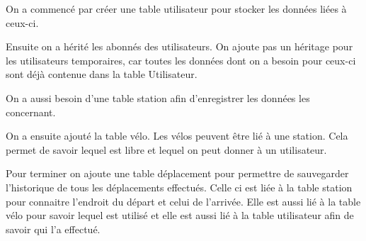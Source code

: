 \documentclass[a4paper, 12pt]{report}
\begin{document}
On a commencé par créer une table utilisateur pour stocker les données liées à ceux-ci.

Ensuite  on a hérité les abonnés des utilisateurs. On ajoute pas un héritage pour les utilisateurs temporaires, car toutes les données dont on a besoin pour ceux-ci sont déjà contenue dans la table Utilisateur.

On a aussi besoin d'une table station afin d'enregistrer les données les concernant.

On a ensuite ajouté la table vélo. Les vélos peuvent être lié à une station. Cela permet de savoir lequel est libre et lequel on peut donner à un utilisateur.

Pour terminer on ajoute une table déplacement pour permettre de sauvegarder l'historique de tous les déplacements effectués. Celle ci est liée à la table station pour connaitre l'endroit du départ et celui de l'arrivée. Elle est aussi lié à la table vélo pour savoir lequel est utilisé  et elle est aussi lié à la table utilisateur afin de savoir qui l'a effectué.
\end{document}
